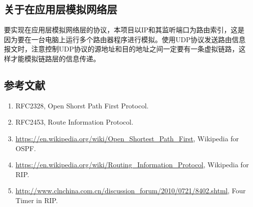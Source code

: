 \documentclass[15pt]{ctexart}
\begin{document}
	\subsection{关于在应用层模拟网络层} %
	\label{sub:关于在应用层模拟网络层协议}
		要实现在应用层模拟网络层的协议，本项目以IP和其监听端口为路由索引，这是因为要在一台电脑上运行多个路由器程序进行模拟。使用UDP协议发送路由信息报文时，注意控制UDP协议的源地址和目的地址之间一定要有一条虚拟链路，这样才能模拟链路层的信息传递。




\newpage
\begin{appendices}
    \section{参考文献} %
        \begin{enumerate}
        \item RFC2328, Open Shorst Path First Protocol.
        \item RFC2453, Route Information Protocol.
        \item \url{https://en.wikipedia.org/wiki/Open_Shortest_Path_First}, Wikipedia for OSPF.
        \item \url{https://en.wikipedia.org/wiki/Routing_Information_Protocol}, Wikipedia for RIP.
        \item \url{http://www.clnchina.com.cn/discussion_forum/2010/0721/8402.shtml}, Four Timer in RIP.
        \end{enumerate}
\end{appendices}
\end{document}
